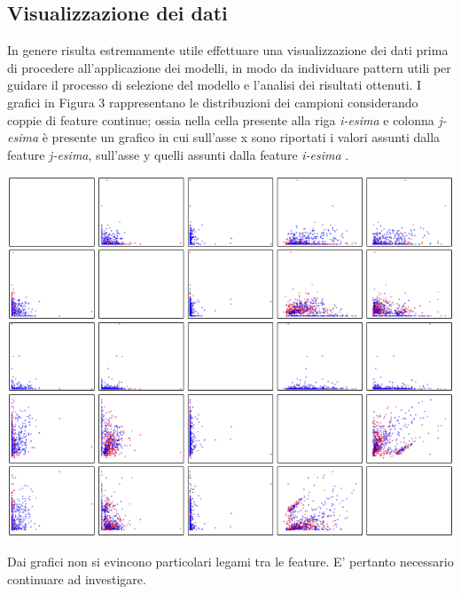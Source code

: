 \documentclass[a4paper,8pt]{article}
\newenvironment{Figure}
  {\par\medskip\noindent\minipage{\linewidth}}
  {\endminipage\par\medskip}
\begin{document}
\begin{multicols}{2}
\section{Visualizzazione dei dati}
In genere risulta estremamente utile effettuare una visualizzazione dei dati prima di procedere all'applicazione dei modelli, in modo da individuare pattern utili per guidare il processo di selezione del modello e l'analisi dei risultati ottenuti. I grafici in Figura 3 rappresentano le distribuzioni dei campioni considerando coppie di feature continue; ossia nella cella presente alla riga \emph{i-esima} e colonna \emph{j-esima} è presente un grafico in cui sull'asse x sono riportati i valori assunti dalla feature \emph{j-esima}, sull'asse y quelli assunti dalla feature \emph{i-esima} .

\begin{Figure}
 \centering
 \includegraphics[width=\linewidth]{mcov}
\end{Figure}

Dai grafici non si evincono particolari legami tra le feature. E' pertanto necessario continuare ad investigare. %

\end{multicols}
\end{document}
